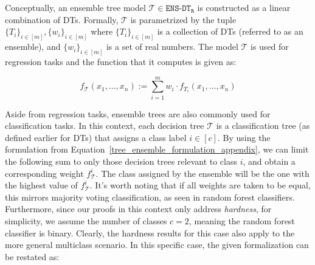 


Conceptually, an ensemble tree model $\mathcal{T} \in  \texttt{ENS-DT}_{\texttt{R}}$ is constructed as a linear combination of DTs. Formally, $\mathcal{T}$ is parametrized by the tuple $\{T_{i}\}_{i \in [m]}, \{ w_{i}\}_{i \in [m]}$ where  $\{T_{i}\}_{i \in [m]}$ is a collection of DTs (referred to as an ensemble), and $\{w_{i}\}_{i \in [m]}$ is a set of real numbers. The model $\mathcal{T}$ is used for regression tasks and the function that it computes is given as:

\begin{equation}
\label{tree_ensemble_formulation_appendix}
    f_{\mathcal{T}}(x_{1}, \ldots, x_{n}) := \sum\limits_{i=1}^{m} w_{i} \cdot f_{T_{i}}(x_{1}, \ldots, x_{n})
\end{equation}


Aside from regression tasks, ensemble trees are also commonly used for classification tasks. In this context, each decision tree $\mathcal{T}$ is a classification tree (as defined earlier for DTs) that assigns a class label $i \in [c]$. By using the formulation from Equation~\ref{tree_ensemble_formulation_appendix}, we can limit the following sum to only those decision trees relevant to class $i$, and obtain a corresponding weight $f^i_{\mathcal{T}}$. The class assigned by the ensemble will be the one with the highest value of $f^i_{\mathcal{T}}$. It’s worth noting that if all weights are taken to be equal, this mirrors majority voting classification, as seen in random forest classifiers. Furthermore, since our proofs in this context only address \emph{hardness}, for simplicity, we assume the number of classes $c = 2$, meaning the random forest classifier is binary. Clearly, the hardness results for this case also apply to the more general multiclass scenario. In this specific case, the given formalization can be restated as:


